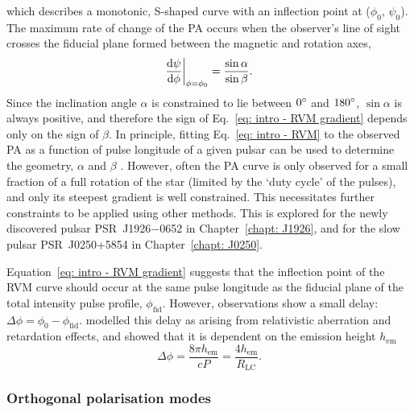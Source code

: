 which describes a monotonic, S-shaped curve with an inflection point at ($\phi_0$, $\psi_0$). The maximum rate of change of the PA occurs when the observer's line of sight crosses the fiducial plane formed between the magnetic and rotation axes,
\begin{equation}
    \label{eq: intro - RVM gradient}
    \frac{\mathrm{d}\psi}{\mathrm{d}\phi}\bigg|_{\phi=\phi_0} = \frac{\sin\alpha}{\sin\beta}.
\end{equation}
Since the inclination angle $\alpha$ is constrained to lie between $0^\circ$ and $180^\circ$, $\sin\alpha$ is always positive, and therefore the sign of Eq.~\eqref{eq: intro - RVM gradient} depends only on the sign of $\beta$. In principle, fitting Eq.~\eqref{eq: intro - RVM} to the observed PA as a function of pulse longitude of a given pulsar can be used to determine the geometry, $\alpha$ and $\beta$ \citep[e.g.][]{EWxx2001, JWxx2006,RWJx2015a}. However, often the PA curve is only observed for a small fraction of a full rotation of the star (limited by the `duty cycle' of the pulses), and only its steepest gradient is well constrained. This necessitates further constraints to be applied using other methods. This is explored for the newly discovered pulsar PSR~J1926$-$0652 in Chapter~\ref{chapt: J1926}, and for the slow pulsar PSR~J0250+5854 in Chapter~\ref{chapt: J0250}.

Equation~\eqref{eq: intro - RVM gradient} suggests that the inflection point of the RVM curve should occur at the same pulse longitude as the fiducial plane of the total intensity pulse profile, $\phi_\mathrm{fid}$. However, observations show a small delay: $\Delta\phi = \phi_0 - \phi_\mathrm{fid}$. \citet{BCWx1991} modelled this delay as arising from relativistic aberration and retardation effects, and showed that it is dependent on the emission height $h_\mathrm{em}$
\begin{equation}
    \label{eq: intro - BCW shift}
    \Delta\phi = \frac{8\pi h_\mathrm{em}}{cP} = \frac{4h_\mathrm{em}}{R_\mathrm{LC}}.
\end{equation}

\subsubsection{Orthogonal polarisation modes}
\label{sec: intro - emission models - polarisation - OPMs}

